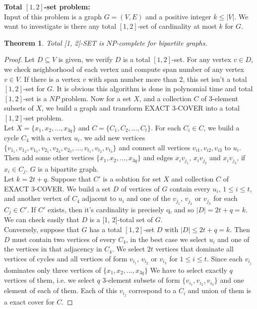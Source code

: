 \documentclass[A4,12pt]{article}
\newtheorem{theorem}{Theorem}[section]
\theoremstyle{definition}
\theoremstyle{remark}
\begin{document}
\textbf{Total $[1, 2]$-set problem:}
\\
Input of this problem is a graph $G = (V, E)$ and a positive integer $k \leq |V|$.
We want to investigate is there any total $[1,2]$-set of cardinality at most $k$ for $G$.

\begin{theorem}\label{Complexity2}
	Total [1, 2]-SET is $NP$-complete for bipartite graphs.
\end{theorem}	
\begin{proof}
	Let $D\subseteq V$ is given, we verify $D$ is a total $[1,2]$-set. For any vertex $v\in D$, we check neighborhood of  each vertex and compute span number of any vertex $v \in V$. If there is a vertex $v$ with span number more than 2, this set isn't a   total $[1,2]$-set for $G$.
	It is obvious this algorithm is done in polynomial time and  total $[1,2]$-set is a $NP$ problem.
	Now for a set $X$, and a collection $C$  of 3-element subsets of $X$, we build a graph and transform EXACT 3-COVER  into a total $[1,2]$-set problem.
	\\	
	Let $X = \{x_{1}, x_{2}, . . . , x_{3q}\}$ and $C = \{C_{1}, C_{2}, . . . , C_{t}\}$.
	For each $C_{i}\in C$, we build a cycle $C_{4}$ with a vertex $u_{i}$. we add new vertices  $\{v_{1_1}, v_{1_2}, v_{1_3}, v_{2_1},v_{2_2},v_{2_3}, ..., v_{t_1},v_{t_2},v_{t_3}\}$ and connect all vertices $v_{i1},v_{i2},v_{i3}$ to $u_i$. Then add some other vertices $\{x_{1}, x_{2}, . . . , x_{3q}\}$ and edges $x_{i}v_{j_1}$, $x_{i}v_{j_2}$ and $x_{i}v_{j_3}$,  if $x_{i}\in C_{j}$. $G$ is a bipartite graph.
	\\
	Let $k = 2t + q$.
	Suppose that $C'$ is a solution for set $X$ and collection  $C$ of EXACT $3$-COVER.
	We build a set $D$ of vertices of $G$ contain every $u_{i}$, $1 \leq i \leq t$,
	and another vertex of $C_{4}$ adjacent to $u_i$ and one of the $v_{j_1}$, $v_{j_2}$ or $v_{j_3}$ for each $C_{j} \in C'$.
	If $C'$ exists, then   it's cardinality is precisely q, and so $|D| = 2t + q = k$.
	We can check easily  that $D$ is a [1, 2]-total set of $G$.
	\\	
	Conversely, suppose that $G$ has a total $[1, 2]$-set $D$ with $|D| \leq 2t + q = k$. Then $D$ must contain two vertices of every $C_{4}$, in the best case we select $u_{i}$ and one of the vertices  in that adjacency in $C_{4}$. We select $2t$ vertices that dominate all vertices of cycles and all vertices of form $v_{i_1}$, $v_{i_2}$ or $v_{i_3}$ for $1 \leq i \leq t$. Since each $v_{i_j}$ dominates only three vertices of $\{x_{1}, x_{2}, . . . ,x_{3q}\}$
	We have to select exactly $q$ vertices of them, i.e. we select $q$ 3-element subsets of form $\{v_{i_1}, v_{i_2}, v_{i_3} \}$ and one element of each of them.
	Each of this $v_{i_j}$ correspond to a $C_i$ and  union of them is a exact cover for $C$.
\end{proof}
\end{document}
